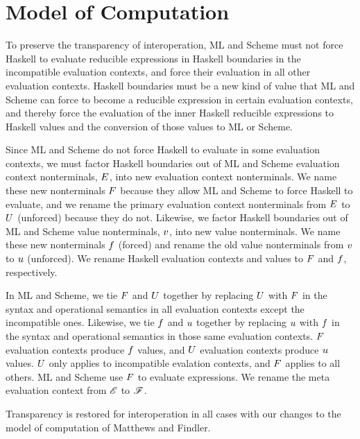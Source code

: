 \chapter{Model of Computation}

To preserve the transparency of interoperation, ML and Scheme must not force Haskell to evaluate reducible expressions in Haskell boundaries in the incompatible evaluation contexts, and force their evaluation in all other evaluation contexts. Haskell boundaries must be a new kind of value that ML and Scheme can force to become a reducible expression in certain evaluation contexts, and thereby force the evaluation of the inner Haskell reducible expressions to Haskell values and the conversion of those values to ML or Scheme.

Since ML and Scheme do not force Haskell to evaluate in some evaluation contexts, we must factor Haskell boundaries out of ML and Scheme evaluation context nonterminals, $E$, into new evaluation context nonterminals. We name these new nonterminals $F$ because they allow ML and Scheme to force Haskell to evaluate, and we rename the primary evaluation context nonterminals from $E$ to $U$ (unforced) because they do not. Likewise, we factor Haskell boundaries out of ML and Scheme value nonterminals, $v$,  into new value nonterminals. We name these new nonterminals $f$ (forced) and rename the old value nonterminals from $v$ to $u$ (unforced). We rename Haskell evaluation contexts and values to $F$ and $f$, respectively.

In ML and Scheme, we tie $F$ and $U$ together by replacing $U$ with $F$ in the syntax and operational semantics in all evaluation contexts except the incompatible ones. Likewise, we tie $f$ and $u$ together by replacing $u$ with $f$ in the syntax and operational semantics in those same evaluation contexts. $F$ evaluation contexts produce $f$ values, and $U$ evaluation contexts produce $u$ values. $U$ only applies to incompatible evalation contexts, and $F$ applies to all others. ML and Scheme use $F$ to evaluate expressions. We rename the meta evaluation context from $\mathscr{E}$ to $\mathscr{F}$.

Transparency is restored for interoperation in all cases with our changes to the model of computation of Matthews and Findler.


